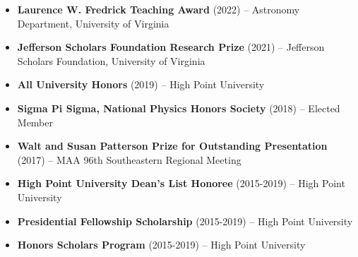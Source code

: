 \documentclass[letterpaper,12pt]{article}
\begin{document}
\vspace{-2mm}
\begin{itemize}
    \item \textbf{Laurence W. Fredrick Teaching Award} (2022) -- Astronomy Department, University of Virginia\vspace{-3mm}
    \item \textbf{Jefferson Scholars Foundation Research Prize} (2021) -- Jefferson Scholars Foundation, University of Virginia\vspace{-3mm}
    \item \textbf{All University Honors} (2019) -- High Point University\vspace{-3mm}
    \item \textbf{Sigma Pi Sigma, National Physics Honors Society} (2018) -- Elected Member\vspace{-3mm}
    \item \textbf{Walt and Susan Patterson Prize for Outstanding Presentation} (2017) -- MAA 96th Southeastern Regional Meeting\vspace{-3mm}
    \item \textbf{High Point University Dean's List Honoree} (2015-2019) -- High Point University\vspace{-3mm}
    \item \textbf{Presidential Fellowship Scholarship} (2015-2019) -- High Point University\vspace{-3mm}
    \item \textbf{Honors Scholars Program} (2015-2019) -- High Point University\vspace{-1mm}
\end{itemize}

\vspace{3mm}
\noindent{}
\end{document}
